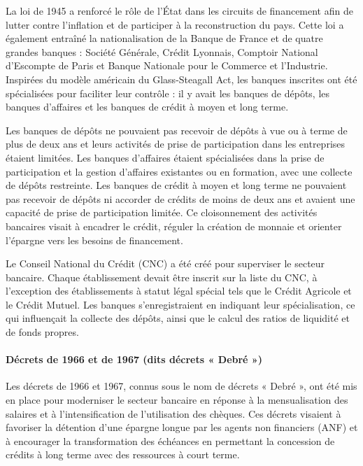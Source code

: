 \documentclass[a4paper, 12pt]{report}
\begin{document}
La loi de 1945 a renforcé le rôle de l'État dans les circuits de financement afin de lutter contre l'inflation et de participer à la reconstruction du pays. Cette loi a également entraîné la nationalisation de la Banque de France et de quatre grandes banques : Société Générale, Crédit Lyonnais, Comptoir National d'Escompte de Paris et Banque Nationale pour le Commerce et l'Industrie. Inspirées du modèle américain du Glass-Steagall Act, les banques inscrites ont été spécialisées pour faciliter leur contrôle : il y avait les banques de dépôts, les banques d'affaires et les banques de crédit à moyen et long terme.

Les banques de dépôts ne pouvaient pas recevoir de dépôts à vue ou à terme de plus de deux ans et leurs activités de prise de participation dans les entreprises étaient limitées. Les banques d'affaires étaient spécialisées dans la prise de participation et la gestion d'affaires existantes ou en formation, avec une collecte de dépôts restreinte. Les banques de crédit à moyen et long terme ne pouvaient pas recevoir de dépôts ni accorder de crédits de moins de deux ans et avaient une capacité de prise de participation limitée. Ce cloisonnement des activités bancaires visait à encadrer le crédit, réguler la création de monnaie et orienter l'épargne vers les besoins de financement.

Le Conseil National du Crédit (CNC) a été créé pour superviser le secteur bancaire. Chaque établissement devait être inscrit sur la liste du CNC, à l'exception des établissements à statut légal spécial tels que le Crédit Agricole et le Crédit Mutuel. Les banques s'enregistraient en indiquant leur spécialisation, ce qui influençait la collecte des dépôts, ainsi que le calcul des ratios de liquidité et de fonds propres.

\paragraph{Décrets de 1966 et de 1967 (dits décrets « Debré »)}

Les décrets de 1966 et 1967, connus sous le nom de décrets « Debré », ont été mis en place pour moderniser le secteur bancaire en réponse à la mensualisation des salaires et à l'intensification de l'utilisation des chèques. Ces décrets visaient à favoriser la détention d'une épargne longue par les agents non financiers (ANF) et à encourager la transformation des échéances en permettant la concession de crédits à long terme avec des ressources à court terme.
\end{document}
